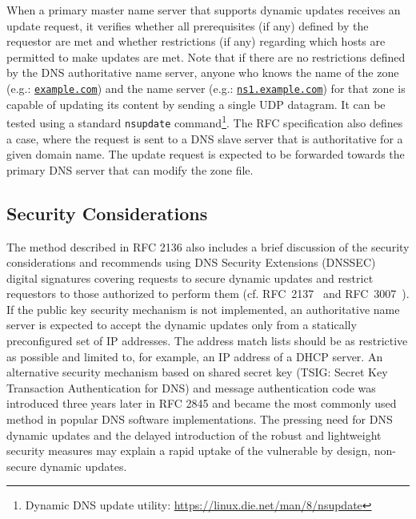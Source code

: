 When a primary master name server that supports dynamic updates receives an update request, it verifies whether all prerequisites (if any) defined by the requestor are met and whether restrictions (if any) regarding which hosts are permitted to make updates are met.
Note that if there are no restrictions defined by the DNS authoritative name server, anyone who knows the name of the zone (e.g.: \texttt{\url{example.com}}) and the name server (e.g.: \texttt{\url{ns1.example.com}}) for that zone is capable of updating its content by sending a single UDP datagram.
It can be tested using a standard \texttt{nsupdate} command\footnote{Dynamic DNS update utility: \url{https://linux.die.net/man/8/nsupdate}}.
%
%
The RFC specification also defines a case, where the request is sent to a DNS slave server that is authoritative for a given domain name.
The update request is expected to be forwarded towards the primary DNS server that can modify the zone file.

\subsection{Security Considerations}
The method described in RFC 2136 also includes a brief discussion of the security considerations and recommends using DNS Security Extensions (DNSSEC) digital signatures covering requests to secure dynamic updates and restrict requestors to those authorized to perform them %
(cf. RFC~2137~\cite{rfc2137} %
and RFC~3007~\cite{rfc3007}).
If the public key security mechanism is not implemented, an authoritative name server is expected to accept the dynamic updates only from a statically preconfigured set of IP addresses.
The address match lists should be as restrictive as possible and limited to, for example, an IP address of a DHCP server.
An alternative security mechanism based on shared secret key (TSIG: Secret Key Transaction Authentication for DNS) and message authentication code was introduced three years later in RFC 2845 \cite{rfc2845} and became the most commonly used method in popular DNS software implementations.
%
%
The pressing need for DNS dynamic updates and the delayed introduction of the robust and lightweight security measures may explain a rapid uptake of the vulnerable by design, non-secure dynamic updates.



